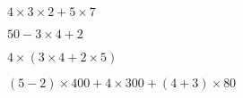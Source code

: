 \begin{multicols}{2}

    $4\times 3\times 2 +5\times 7$
    

    $50-3\times 4+2$
\end{multicols}

\begin{multicols}{2}
    
    
    $4\times (3\times 4 + 2\times 5)$
    
    
    $(5-2)\times 400 +4\times 300+(4+3)\times 80$
\end{multicols}